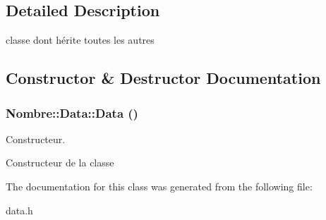 \subsection{Detailed Description}
classe dont hérite toutes les autres 

\subsection{Constructor \& Destructor Documentation}
\hypertarget{classNombre_1_1Data_a5ecec0762dd46ac0feecc10d11d622bd}{
\subsubsection[{Data}]{\setlength{\rightskip}{0pt plus 5cm}Nombre::Data::Data ()}}
\label{classNombre_1_1Data_a5ecec0762dd46ac0feecc10d11d622bd}


Constructeur. 

Constructeur de la classe 

The documentation for this class was generated from the following file:\begin{DoxyCompactItemize}
\item 
data.h\end{DoxyCompactItemize}
